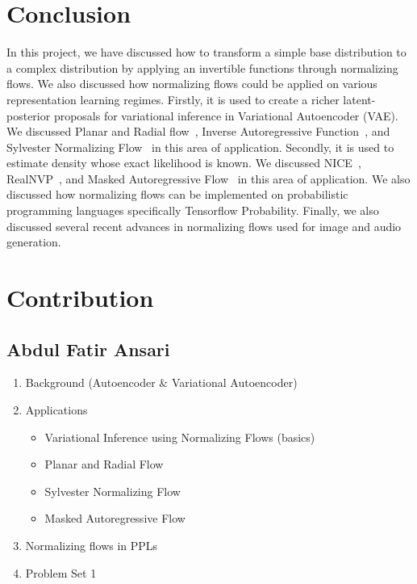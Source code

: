 \documentclass[runningheads]{llncs}
\begin{document}
\section{Conclusion}
In this project, we have discussed how to transform a simple base distribution to a complex distribution by applying an invertible functions through normalizing flows. We also discussed how normalizing flows could be applied on various representation learning regimes. Firstly, it is used to create a richer latent-posterior proposals for variational inference in Variational Autoencoder (VAE). We discussed Planar and Radial flow~\cite{rezende2015variational}, Inverse Autoregressive Function~\cite{kingma2016improved}, and Sylvester Normalizing Flow~\cite{van2018sylvester} in this area of application.  Secondly, it is used to estimate density whose exact likelihood is known. We discussed NICE~\cite{dinh2014nice}, RealNVP~\cite{dinh2016density}, and Masked Autoregressive Flow~\cite{papamakarios2017masked} in this area of application. We also discussed how normalizing flows can be implemented on probabilistic programming languages specifically Tensorflow Probability. Finally, we also discussed several recent advances in normalizing flows used for image and audio generation.

%
%
%
% 
% 
%

 




\appendix


\section{Contribution}
\subsection*{Abdul Fatir Ansari}
\begin{enumerate}
	\item Background (Autoencoder \& Variational Autoencoder)
	\item Applications
	\begin{itemize}
		\item Variational Inference using Normalizing Flows (basics)
		\item Planar and Radial Flow
		\item Sylvester Normalizing Flow
		\item Masked Autoregressive Flow
	\end{itemize}
	\item Normalizing flows in PPLs
	\item Problem Set 1
\end{enumerate}
\end{document}
